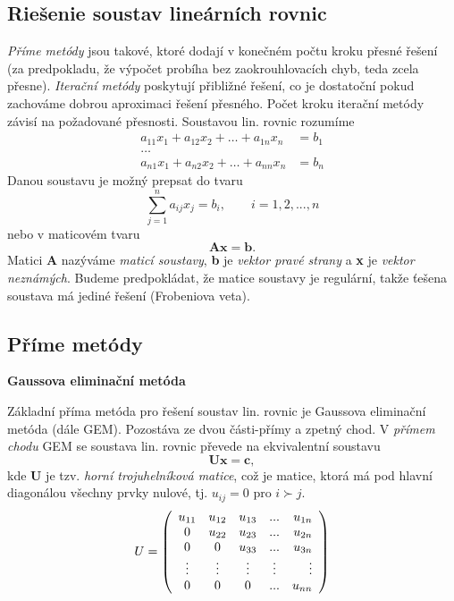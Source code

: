 \subsection{Riešenie soustav lineárních rovnic}  
\textit{Příme metódy} jsou takové, ktoré dodají v konečném počtu kroku přesné řešení (za predpokladu, že výpočet probíha bez zaokrouhlovacích chyb, teda zcela přesne).
\newline\textit{Iterační metódy} poskytují přibližné řešení, co je dostatoční pokud zachováme dobrou aproximaci řešení přesného. Počet kroku iterační metódy závisí na požadované přesnosti.
 \newline \newline Soustavou lin. rovnic rozumíme
\begin{align*}
a_{11} x_1 + a_{12} x_2 + \ldots + a_{1n} x_n &= b_1 \\
\ldots \\ 
a_{n1} x_1 + a_{n2} x_2 + \ldots + a_{nn} x_n &= b_n
\end{align*}
Danou soustavu je možný prepsat do tvaru $$ \sum_{j=1}^{n} a_{ij}x_j=b_i, \qquad i=1,2,...,n$$
 nebo v maticovém tvaru $$\textbf{Ax}=\textbf{b}.$$
Matici \textbf{A} nazýváme \textit{maticí soustavy}, \textbf{b} je \textit{vektor pravé strany} a  \textbf{x} je  \textit{vektor neznámých}. Budeme predpokládat, že matice soustavy je regulární, takže ťešena soustava má jediné řešení (Frobeniova veta).
 \subsection{Příme metódy}
\textbf{Gaussova eliminační metóda}

Základní příma metóda pro řešení soustav lin. rovnic je Gaussova eliminační metóda (dále GEM). Pozostáva ze dvou části-přímy a zpetný chod.
\newline V \textit{přímem chodu} GEM se soustava lin. rovnic převede na ekvivalentní soustavu $$\textbf{Ux}=\textbf{c},$$ kde \textbf{U} je tzv. \textit{horní trojuhelníková matice}, což je matice, ktorá má pod hlavní diagonálou všechny prvky nulové, tj. $u_{ij}=0$ pro $i\succ j$.
\newline     
$$U=\left( 
\begin{array}{ccc c r}
    u_{11} & u_{12} & u_{13} & ... & u_{1n} \\
    0 & u_{22} & u_{23} & ...  & u_{2n} \\
    0 & 0 & u_{33} & ... & u_{3n} \\
   \vdots & \vdots & \vdots & \vdots & \vdots \\
    0 & 0 & 0 & ... & u_{nn} \\ 
    \end{array} 
\right)$$


